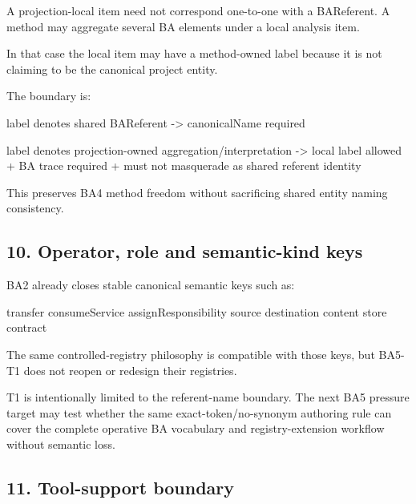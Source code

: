\documentclass[
  10pt,
  a4paper,
]{article}
\newenvironment{Shaded}{}{}
\newcommand{\NormalTok}[1]{#1}
\begin{document}
A projection-local item need not correspond one-to-one with a
BAReferent. A method may aggregate several BA elements under a local
analysis item.

In that case the local item may have a method-owned label because it is
not claiming to be the canonical project entity.

The boundary is:

\begin{Shaded}
\begin{Highlighting}[]
\NormalTok{label denotes shared BAReferent}
\NormalTok{    {-}\textgreater{} canonicalName required}

\NormalTok{label denotes projection{-}owned aggregation/interpretation}
\NormalTok{    {-}\textgreater{} local label allowed}
\NormalTok{       + BA trace required}
\NormalTok{       + must not masquerade as shared referent identity}
\end{Highlighting}
\end{Shaded}

This preserves BA4 method freedom without sacrificing shared entity
naming consistency.

\subsection{10. Operator, role and semantic-kind
keys}\label{operator-role-and-semantic-kind-keys}

BA2 already closes stable canonical semantic keys such as:

\begin{Shaded}
\begin{Highlighting}[]
\NormalTok{transfer}
\NormalTok{consumeService}
\NormalTok{assignResponsibility}
\NormalTok{source}
\NormalTok{destination}
\NormalTok{content}
\NormalTok{store}
\NormalTok{contract}
\end{Highlighting}
\end{Shaded}

The same controlled-registry philosophy is compatible with those keys,
but BA5-T1 does not reopen or redesign their registries.

T1 is intentionally limited to the referent-name boundary. The next BA5
pressure target may test whether the same exact-token/no-synonym
authoring rule can cover the complete operative BA vocabulary and
registry-extension workflow without semantic loss.

\subsection{11. Tool-support boundary}\label{tool-support-boundary}
\end{document}
